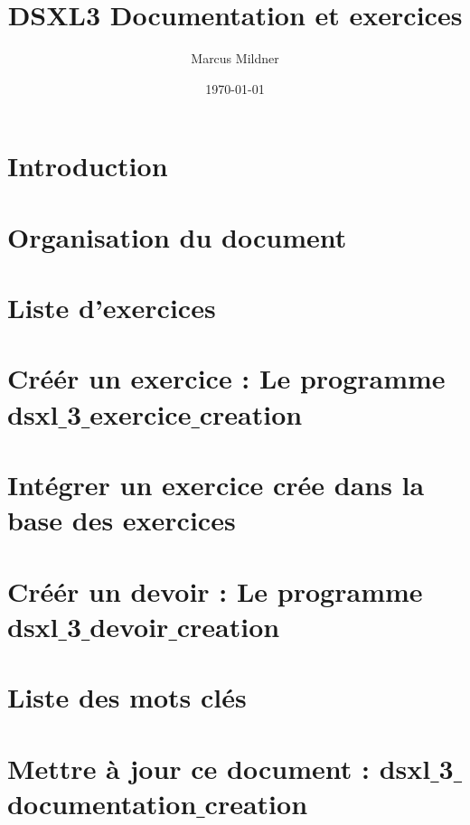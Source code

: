 \documentclass{book}
\title{DSXL3 Documentation et exercices}
\author{Marcus Mildner}
\date{\today}
\begin{document}
\maketitle
\frontmatter
\chapter{Introduction}


\newpage
\tableofcontents
\listoffigures
\listoftables
\mainmatter
\chapter{Organisation du document}



\chapter{Liste d'exercices}


\chapter{Créér un exercice : Le programme dsxl$\_$3$\_$exercice$\_$creation}


\chapter{Intégrer un exercice crée dans la base des exercices}



\chapter{Créér un devoir : Le programme dsxl$\_$3$\_$devoir$\_$creation}




\appendix
\chapter{Liste des mots clés}


\chapter{Mettre à jour ce document : dsxl$\_$3$\_$documentation$\_$creation}

\backmatter
\end{document}
